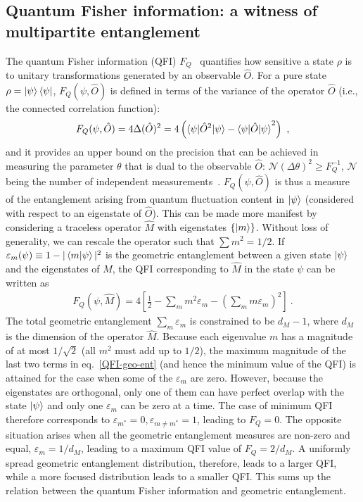 \subsection{Quantum Fisher information: a witness of multipartite entanglement}
The quantum Fisher information (QFI) \(F_Q\)~\cite{braunstein1994statistical,Hauke2016} quantifies how sensitive a state \(\rho\) is to unitary transformations generated by an observable \(\hat O\).
For a pure state \(\rho = \ket{\psi}\bra{\psi}\), \(F_Q (\psi,\hat O)\) is defined in terms of the variance of the operator $\hat O$ (i.e., the connected correlation function):
\begin{eqnarray}
	F_Q(\psi,\hat O) = 4 \Delta (\hat O)^{2}= 4\left(\braket{\psi|\hat O^2|\psi} - \braket{\psi|\hat O|\psi}^2\right)~,
\end{eqnarray}
and it provides an upper bound on the precision that can be achieved in measuring the parameter \(\theta\) that is dual to the observable \(\hat O\): \(\mathcal{N}\left( \Delta \theta \right)^2 \geq F_Q^{-1} \), \(\mathcal{N}\) being the number of independent measurements~\cite{braunstein1994statistical,Hauke2016}.
\(F_Q (\psi,\hat O)\) is thus a measure of the entanglement arising from quantum fluctuation content in $\ket{\psi}$ (considered with respect to an eigenstate of $\hat O$).
This can be made more manifest by considering a traceless operator \(\hat M\) with eigenstates \(\left\{\ket{m}\right\}\).
Without loss of generality, we can rescale the operator such that \(\sum m^2 = 1/2\).
If \(\varepsilon_m(\psi) \equiv 1 - |\braket{m | \psi}|^2\) is the geometric entanglement between a given state \(\ket{\psi}\) and the eigenstates of \(\hat M\), the QFI corresponding to \(\hat M\) in the state \(\psi\) can be written as
\begin{eqnarray}\label{QFI-geo-ent}
	F_Q(\psi,\hat M) = 4\left[\frac{1}{2} - \sum_m m^2\varepsilon_m - \left(\sum_m m\varepsilon_m\right)^2 \right] ~.
\end{eqnarray}
The total geometric entanglement \(\sum_m \varepsilon_m\) is constrained to be \(d_M - 1\), where \(d_M\) is the dimension of the operator \(\hat M\).
Because each eigenvalue \(m\) has a magnitude of at most \(1/\sqrt 2\) (all \(m^2\) must add up to \(1/2\)), the maximum magnitude of the last two terms in eq.~\eqref{QFI-geo-ent} (and hence the minimum value of the QFI) is attained for the case when some of the \(\varepsilon_m\) are zero.
However, because the eigenstates are orthogonal, only one of them can have perfect overlap with the state \(\ket{\psi}\) and only one \(\varepsilon_m\) can be zero at a time.
The case of minimum QFI therefore corresponds to \(\varepsilon_{m^*} = 0, \varepsilon_{m\neq m^*}=1\), leading to \(F_Q = 0\).
The opposite situation arises when all the geometric entanglement measures are non-zero and equal, \(\varepsilon_m = 1/d_M\), leading to a maximum QFI value of \(F_Q = 2/d_M\).
A uniformly spread geometric entanglement distribution, therefore, leads to a larger QFI, while a more focused distribution leads to a smaller QFI.
This sums up the relation between the quantum Fisher information and geometric entanglement.

